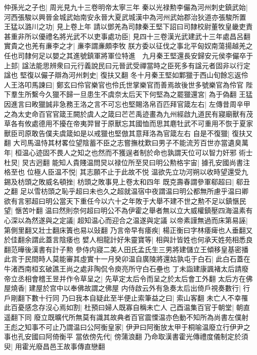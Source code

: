 仲孫光之子也|{
	周光見九十三卷明帝太寧三年}
秦以光禄勲李儼為河州刺史鎮武始|{
	河西張駿以興晉金城武始南安永晉大夏武城漢中為河州武始郡治狄道亦張駿所置}
王猛以潞川之功|{
	見上卷上年}
請以鄧羌為司隸秦王堅下詔曰司隸校尉董牧皇畿吏責甚重非所以優禮名將光武不以吏事處功臣|{
	見四十三卷漢光武建武十三年處昌呂翻}
實貴之也羌有亷李之才|{
	亷李謂亷頗李牧}
朕方委以征伐之事北平匈奴南蕩揚越羌之任也司隸何足以嬰之其進號鎮軍將軍位特進　九月秦王堅還長安歸安元侯李儼卒于上邽|{
	諡法能思辨衆曰元行義說民曰元晉武受禪當時之臣死多有諡元者固非以行定諡也}
堅復以儼子辯為河州刺史|{
	復扶又翻}
冬十月秦王堅如鄴獵于西山旬餘忘返伶人王洛叩馬諫曰|{
	鄭玄曰伶官樂官也伶氏世掌樂官而善焉故後世多號樂官為伶官}
陛下羣生所繫今久獵不歸一旦患生不虞奈太后天下何堅為之罷獵還宮|{
	為于偽翻}
王猛因進言曰畋獵誠非急務王洛之言不可忘也堅賜洛帛百匹拜官箴左右|{
	左傳昔周辛甲之為太史命百官官箴王闕於虞人之箴曰芒芒禹迹畫為九州經啟九道民有寢廟獸有茂草各有攸處德用不擾在帝夷羿冒于原獸忘其國恤而思其麀牡武不可重用不恢于夏家獸臣司原敢告僕夫虞箴如是以戒獵也堅倣其意拜洛為官箴左右}
自是不復獵|{
	復扶又翻}
大司馬温恃其材畧位望陰蓄不臣之志嘗撫枕歎曰男子不能流芳百世亦當遺臭萬年|{
	桓温心迹固不畏人之知之也然而不獲逞者制於命也孰謂天位可以智力奸邪}
術士杜炅|{
	炅古迥翻}
能知人貴賤温問炅以禄位所至炅曰明公勲格宇宙|{
	據孔安國尚書注格至也}
位極人臣温不悦|{
	其志願不止于此故不悦}
温欲先立功河朔以收時望還受九錫及枋頭之敗威名頓挫|{
	枋頭之敗事見上卷太和四年}
既克壽春謂參軍郗超曰|{
	郗丑之翻}
足以雪枋頭之恥乎超曰未也久之超就温宿中夜謂温曰明公都無所慮乎温曰卿欲有言邪超曰明公當天下重任今以六十之年敗于大舉不建不世之勲不足以鎮愜民望|{
	愜苦叶翻}
温曰然則奈何超曰明公不為伊霍之舉者無以立大威權鎮壓四海温素有心深以為然遂與之定議|{
	超知温心而迎合之温遂與定議}
以帝素謹無過而床第易誣|{
	第側里翻又壯士翻床簀也易以䜴翻}
乃言帝早有痿疾|{
	楊正衡曰字林痿痺也人垂翻又於佳翻余謂此蓋言陰痿也}
嬖人相龍計好朱靈寶等|{
	相與計皆姓也何承天姓苑相悉良翻范曄後漢書有計子勲}
參侍内寢二美人田氏孟氏生三男將建儲立王傾移皇基密播此言于民間時人莫能審其虛實十一月癸卯温自廣陵將還姑孰屯于白石|{
	此白石蓋在牛渚西南桓玄破譙王尚之處非陶侃令庾亮所守白石壘也}
丁未詣建康諷褚太后請廢帝立丞相會稽王昱并作令草呈之|{
	先草定太后令而呈之於太后會工外翻}
太后方在佛屋燒香|{
	建屋於宫中以奉佛故謂之佛屋}
内侍啟云外有急奏太后出倚戶視奏數行|{
	行戶剛翻下數十行同}
乃曰我本自疑此至半便止索筆益之曰|{
	索山客翻}
未亡人不幸罹此百憂感念存沒心焉如割|{
	杜預曰婦人既寡自稱未亡人}
己酉温集百官于朝堂|{
	朝直遥翻下同}
廢立既曠代所無莫有識其故典者百官震慄温亦色動不知所為尚書左僕射王彪之知事不可止乃謂温曰公阿衡皇家|{
	伊尹曰阿衡放太甲于桐喻温廢立行伊尹之事也孔安國曰阿倚衡平}
當依傍先代|{
	傍蒲浪翻}
乃命取漢書霍光傳禮度儀制定於須臾|{
	用霍光廢昌邑王故事傳直戀翻}
